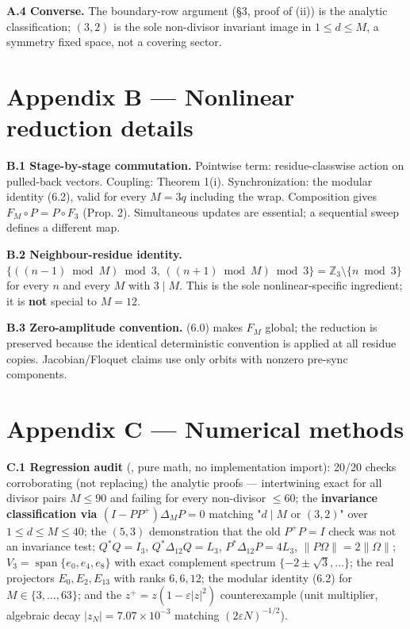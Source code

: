 \documentclass[
  11pt,
  a4paper,
]{article}
\begin{document}
\textbf{A.4 Converse.} The boundary-row argument (§3, proof of (ii)) is the analytic classification; \((3,2)\) is the sole non-divisor invariant image in \(1\le d\le M\), a symmetry fixed space, not a covering sector.

\section{Appendix B --- Nonlinear reduction details}\label{appendix-b-nonlinear-reduction-details}

\textbf{B.1 Stage-by-stage commutation.} Pointwise term: residue-classwise action on pulled-back vectors. Coupling: Theorem 1(i). Synchronization: the modular identity (6.2), valid for every \(M=3q\) including the wrap. Composition gives \(F_M\circ P=P\circ F_3\) (Prop. 2). Simultaneous updates are essential; a sequential sweep defines a different map.

\textbf{B.2 Neighbour-residue identity.} \(\{((n{-}1)\bmod M)\bmod3,\,((n{+}1)\bmod M)\bmod3\}=\mathbb Z_3\setminus\{n\bmod3\}\) for every \(n\) and every \(M\) with \(3\mid M\). This is the sole nonlinear-specific ingredient; it is \textbf{not} special to \(M=12\).

\textbf{B.3 Zero-amplitude convention.} (6.0) makes \(F_M\) global; the reduction is preserved because the identical deterministic convention is applied at all residue copies. Jacobian/Floquet claims use only orbits with nonzero pre-sync components.

\section{Appendix C --- Numerical methods}\label{appendix-c-numerical-methods}

\textbf{C.1 Regression audit} (, pure math, no implementation import): 20/20 checks corroborating (not replacing) the analytic proofs --- intertwining exact for all divisor pairs \(M\le90\) and failing for every non-divisor \(\le60\); the \textbf{invariance classification via \((I-PP^{+})\Delta_M P=0\)} matching "\(d\mid M\) or \((3,2)\)" over \(1\le d\le M\le40\); the \((5,3)\) demonstration that the old \(P^{+}P=I\) check was not an invariance test; \(Q^\ast Q=I_3\), \(Q^\ast\Delta_{12}Q=L_3\), \(P^\ast\Delta_{12}P=4L_3\), \(\|P\Omega\|=2\|\Omega\|\); \(V_3=\operatorname{span}\{e_0,e_4,e_8\}\) with exact complement spectrum \(\{-2\pm\sqrt3,\dots\}\); the real projectors \(E_0,E_2,E_{13}\) with ranks \(6,6,12\); the modular identity (6.2) for \(M\in\{3,\dots,63\}\); and the \(z^+=z(1-\varepsilon|z|^2)\) counterexample (unit multiplier, algebraic decay \(|z_N|=7.07\times10^{-3}\) matching \((2\varepsilon N)^{-1/2}\)).
\end{document}
